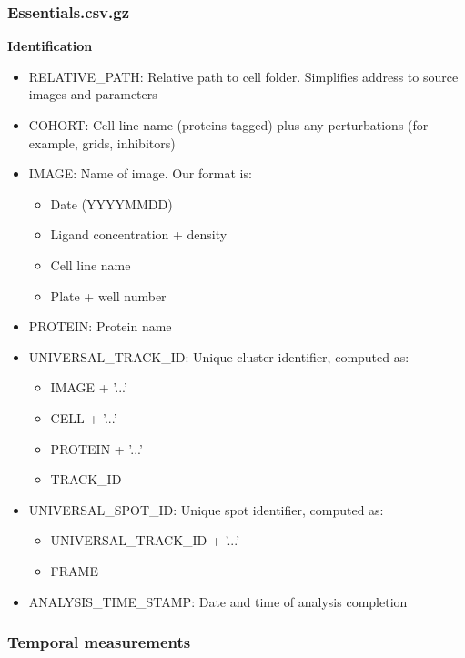 \subsubsection*{Essentials.csv.gz}

\textbf{Identification}

\begin{itemize}
    \item RELATIVE\_PATH: Relative path to cell folder. Simplifies address to source images and parameters
    \item COHORT: Cell line name (proteins tagged) plus any perturbations (for example, grids, inhibitors)
    \item IMAGE: Name of image. Our format is:
    \begin{itemize}
        \item Date (YYYYMMDD)
        \item Ligand concentration + density
        \item Cell line name
        \item Plate + well number
    \end{itemize}
    \item PROTEIN: Protein name
    \item UNIVERSAL\_TRACK\_ID: Unique cluster identifier, computed as:
    \begin{itemize}
        \item IMAGE + '...'
        \item CELL + '...'
        \item PROTEIN + '...'
        \item TRACK\_ID
    \end{itemize}
    \item UNIVERSAL\_SPOT\_ID: Unique spot identifier, computed as:
    \begin{itemize}
        \item UNIVERSAL\_TRACK\_ID + '...'
        \item FRAME
    \end{itemize}
    \item ANALYSIS\_TIME\_STAMP: Date and time of analysis completion
\end{itemize}

\subsubsection*{Temporal measurements}


